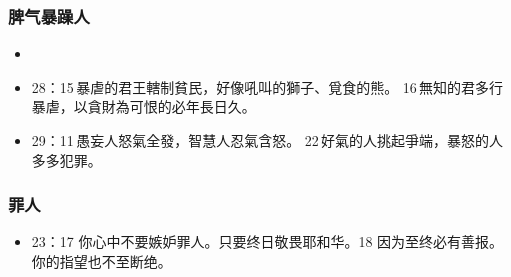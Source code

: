 \subsubsection{脾气暴躁人}
\begin{itemize}
\itemsep-.45em 
\item 
\item 28：15 暴虐的君王轄制貧民，好像吼叫的獅子、覓食的熊。 16 無知的君多行暴虐，以貪財為可恨的必年長日久。
\item 29：11 愚妄人怒氣全發，智慧人忍氣含怒。 22 好氣的人挑起爭端，暴怒的人多多犯罪。
\end{itemize}

\subsubsection{罪人}
\begin{itemize}
\itemsep-.45em 
\item 23：17 你心中不要嫉妒罪人。只要终日敬畏耶和华。18 因为至终必有善报。你的指望也不至断绝。
\end{itemize}

